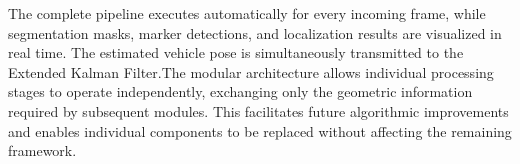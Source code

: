 The complete pipeline executes automatically for every incoming frame, while segmentation masks, marker detections, and localization results are visualized in real time. The estimated vehicle pose is simultaneously transmitted to the Extended Kalman Filter.The modular architecture allows individual processing stages to operate independently, exchanging only the geometric information required by subsequent modules. This facilitates future algorithmic improvements and enables individual components to be replaced without affecting the remaining framework. \cite{jocher2023ultralytics, bradski2008learningopencv}

